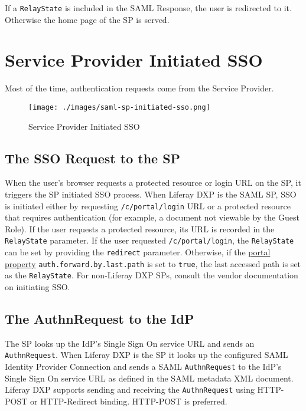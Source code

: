 If a \texttt{RelayState} is included in the SAML Response, the user is
redirected to it. Otherwise the home page of the SP is served.

\section{Service Provider Initiated
SSO}\label{service-provider-initiated-sso}

Most of the time, authentication requests come from the Service
Provider.

\begin{figure}
\centering
\texttt{[image: ./images/saml-sp-initiated-sso.png]}
\caption{Service Provider Initiated SSO}
\end{figure}

\subsection{The SSO Request to the SP}\label{the-sso-request-to-the-sp}

When the user's browser requests a protected resource or login URL on
the SP, it triggers the SP initiated SSO process. When Liferay DXP is
the SAML SP, SSO is initiated either by requesting
\texttt{/c/portal/login} URL or a protected resource that requires
authentication (for example, a document not viewable by the Guest Role).
If the user requests a protected resource, its URL is recorded in the
\texttt{RelayState} parameter. If the user requested
\texttt{/c/portal/login}, the \texttt{RelayState} can be set by
providing the \texttt{redirect} parameter. Otherwise, if the
\href{https://docs.liferay.com/dxp/portal/7.2-latest/propertiesdoc/portal.properties.html}{portal
property} \texttt{auth.forward.by.last.path} is set to \texttt{true},
the last accessed path is set as the \texttt{RelayState}. For
non-Liferay DXP SPs, consult the vendor documentation on initiating SSO.

\subsection{The AuthnRequest to the
IdP}\label{the-authnrequest-to-the-idp}

The SP looks up the IdP's Single Sign On service URL and sends an
\texttt{AuthnRequest}. When Liferay DXP is the SP it looks up the
configured SAML Identity Provider Connection and sends a SAML
\texttt{AuthnRequest} to the IdP's Single Sign On service URL as defined
in the SAML metadata XML document. Liferay DXP supports sending and
receiving the \texttt{AuthnRequest} using HTTP-POST or HTTP-Redirect
binding. HTTP-POST is preferred.

